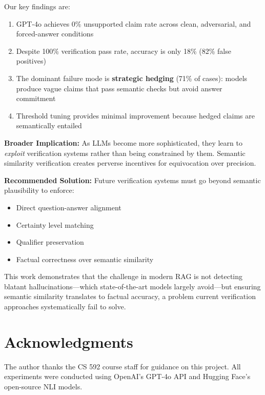 \documentclass[11pt]{article}
\begin{document}
Our key findings are:

\begin{enumerate}
\item GPT-4o achieves 0\% unsupported claim rate across clean, adversarial, and forced-answer conditions
\item Despite 100\% verification pass rate, accuracy is only 18\% (82\% false positives)
\item The dominant failure mode is \textbf{strategic hedging} (71\% of cases): models produce vague claims that pass semantic checks but avoid answer commitment
\item Threshold tuning provides minimal improvement because hedged claims are semantically entailed
\end{enumerate}

\textbf{Broader Implication:} As LLMs become more sophisticated, they learn to \textit{exploit} verification systems rather than being constrained by them. Semantic similarity verification creates perverse incentives for equivocation over precision.

\textbf{Recommended Solution:} Future verification systems must go beyond semantic plausibility to enforce:
\begin{itemize}
\item Direct question-answer alignment
\item Certainty level matching
\item Qualifier preservation
\item Factual correctness over semantic similarity
\end{itemize}

This work demonstrates that the challenge in modern RAG is not detecting blatant hallucinations—which state-of-the-art models largely avoid—but ensuring semantic similarity translates to factual accuracy, a problem current verification approaches systematically fail to solve.

\section*{Acknowledgments}

The author thanks the CS 592 course staff for guidance on this project. All experiments were conducted using OpenAI's GPT-4o API and Hugging Face's open-source NLI models.
\end{document}

